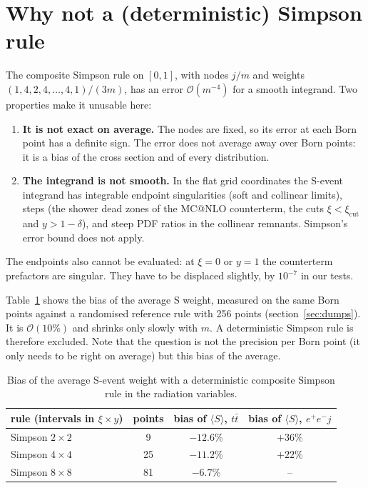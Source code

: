\documentclass[11pt,a4paper]{article}
\makeatletter
\newcommand{\mcatnlo}{\textsc{MC@NLO}}
\makeatother
\begin{document}
\section{Why not a (deterministic) Simpson rule}
\label{sec:simpson}

The composite Simpson rule on $[0,1]$, with nodes $j/m$ and weights $(1,4,2,4,\dots,4,1)/(3m)$,
has an error $\mathcal O(m^{-4})$ for a smooth integrand. Two properties make it unusable here:
\begin{enumerate}
\item \textbf{It is not exact on average.} The nodes are fixed, so its error at each Born
point has a definite sign. The error does not average away over Born points: it is a bias
of the cross section and of every distribution.
\item \textbf{The integrand is not smooth.} In the flat grid coordinates the S-event
integrand has integrable endpoint singularities (soft and collinear limits), steps (the
shower dead zones of the \mcatnlo{} counterterm, the cuts $\xi<\xi_{\mathrm{cut}}$ and
$y>1-\delta$), and steep PDF ratios in the collinear remnants. Simpson's error bound does
not apply.
\end{enumerate}
The endpoints also cannot be evaluated: at $\xi=0$ or $y=1$ the counterterm prefactors are
singular. They have to be displaced slightly, by $10^{-7}$ in our tests.

Table~\ref{tab:simpson} shows the bias of the average S weight, measured on the same Born
points against a randomised reference rule with 256 points (section~\ref{sec:dumps}). It
is $\mathcal O(10\%)$ and shrinks only slowly with $m$. A deterministic Simpson rule is
therefore excluded. Note that the question is not the precision per Born point (it only
needs to be right on average) but this bias of the average.

\begin{table}[t]
\centering
\begin{tabular}{lccc}
\toprule
rule (intervals in $\xi\times y$) & points & bias of $\langle S\rangle$, $t\bar t$ & bias of $\langle S\rangle$, $e^+e^-j$ \\
\midrule
Simpson $2\times2$ & 9  & $-12.6\%$ & $+36\%$ \\
Simpson $4\times4$ & 25 & $-11.2\%$ & $+22\%$ \\
Simpson $8\times8$ & 81 & $-6.7\%$  & -- \\
\bottomrule
\end{tabular}
\caption{Bias of the average S-event weight with a deterministic composite Simpson rule in the radiation variables.}
\label{tab:simpson}
\end{table}
\end{document}
